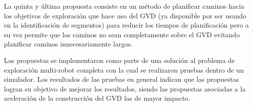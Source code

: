 La quinta y última propuesta consiste en un método de planificar caminos hacia
los objetivos de exploración que hace uso del GVD (ya disponible por ser usando
en la identificación de segmentos) para reducir los tiempos de planificación
pero a su vez permite que los caminos no sean completamente sobre el GVD evitando
planificar caminos innecesariamente largos.

Las propuestas se implementaron como parte de una solución al problema de
exploración multi-robot completa con la cual se realizaron pruebas dentro de un
simulador. Los resultados de las pruebas en general indican que las propuestas
logran su objetivo de mejorar los resultados, siendo las propuestas asociadas a
la aceleración de la construcción del GVD las de mayor impacto.
